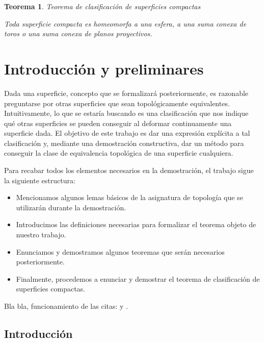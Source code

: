 \documentclass[a4paper,11pt,spanish, twoside, leqno]{tfg-uam}
\newtheorem{teor}{Teorema}[chapter]
\theoremstyle{definition}
\begin{document}
\begin{teor}{Teorema de clasificación de superficies compactas}\label{teor:teoremadeclasificacion}
	
	Toda superficie compacta es homeomorfa a una esfera, a una suma conexa de toros o una suma conexa de planos proyectivos.
\end{teor}









\chapter{Introducci\'on y preliminares}\label{chap1}
\setcounter{page}{1}

Dada una superficie, concepto que se formalizará posteriormente, es razonable preguntarse por otras superficies que sean topológicamente equivalentes. Intuitivamente, lo que se estaría buscando es una clasificación que nos indique qué otras superficies se pueden conseguir al deformar continuamente una superficie dada. El objetivo de este trabajo es dar una expresión explícita a tal clasificación y, mediante una demostración constructiva, dar un método para conseguir la clase de equivalencia topológica de una superficie cualquiera.

Para recabar todos los elementos necesarios en la demostración, el trabajo sigue la siguiente estructura:
\begin{itemize}\itemsep=0pt
\item
Mencionamos algunos lemas básicos de la asignatura de topología que se utilizarán durante la demostración.

\item
Introducimos las definiciones necesarias para formalizar el teorema objeto de nuestro trabajo.
\item
Enunciamos y demostramos algunos teoremas que serán necesarios posteriormente.
\item
Finalmente, procedemos a enunciar y demostrar el teorema de clasificación de superficies compactas.
\end{itemize}

Bla bla, funcionamiento de las citas: \cite{Abel} y \cite{S-W}.

\section{Introducci\'on}
\end{document}
